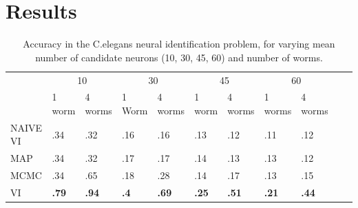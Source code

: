 \documentclass{article}
\begin{document}
\section{Results}
\label{sec:results}

\begin{table}[t]
     \caption{Accuracy in the C.elegans neural identification problem, for varying mean number of candidate neurons (10, 30, 45, 60) and number of worms.}
   \label{table:celeganssup}

   \centering
  \begin{tabular}{lllllllllll}
    & \multicolumn{2}{c}{10} & \multicolumn{2}{c}{30} &   \multicolumn{2}{c}{45} & \multicolumn{2}{c}{60} \\
    \cmidrule(lr){2-3} \cmidrule(lr){4-5} \cmidrule(lr){6-7} \cmidrule(lr){8-9}
& 1 worm & 4 worms & 1 Worm & 4 worms & 1 worm & 4 worms & 1 worms & 4 worms \\
    \midrule 
    NAIVE VI &.34 & .32 & .16 & .16 & .13 & .12 & .11 & .12 \\
   MAP   & .34 & .32  &.17 &.17& .14 & .13 & .13 & .12 \\
    MCMC   & .34 & .65  &.18 &.28& .14 & .17 & .13 & .15 \\
    VI   & \textbf{.79} & \textbf{.94} & \textbf{.4} & \textbf{.69} & \textbf{.25}&  \textbf{.51} & \textbf{.21} & \textbf{.44}\\
 
    \bottomrule
  \end{tabular}
\end{table}
\end{document}
